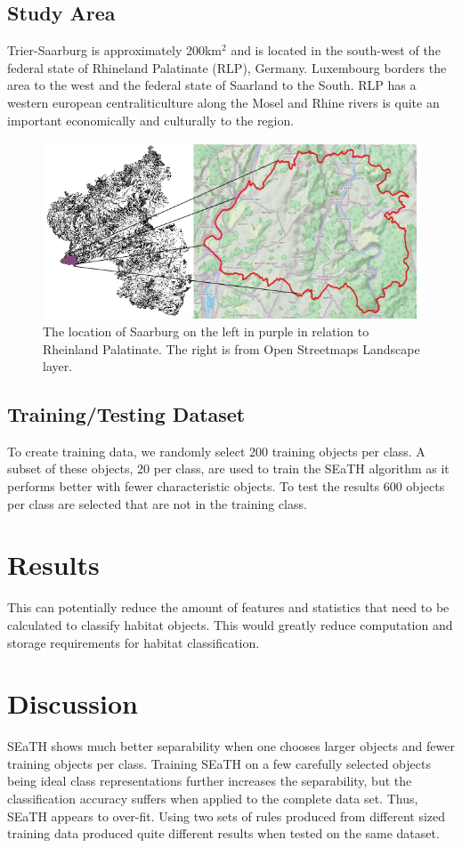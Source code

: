 \documentclass[authoryear, review,12pt,number]{elsarticle}
\begin{document}
\subsection{Study Area}
Trier-Saarburg is approximately 200km$^{2}$ and is located in the south-west of 
the federal state of Rhineland Palatinate (RLP), Germany. Luxembourg borders 
the area to the west and the federal state of Saarland to the South. 
RLP has a western european centraliticulture along the Mosel and Rhine rivers 
is quite an important economically and culturally to the region. 
\begin{figure}
	\includegraphics[width=\textwidth]{diagrams/study_area_closeup.png}
	\caption{The location of Saarburg on the left in purple in relation to 
Rheinland Palatinate. The right is from Open Streetmaps Landscape layer. }
\end{figure}

\subsection{Training/Testing Dataset}
To create training data, we randomly select 200 training objects per class. A
subset of these objects, 20 per class, are used to train the SEaTH
algorithm as it performs better with fewer characteristic objects. To test the 
results 600 objects per class are selected that are not in the training class.

\section{Results}
This can potentially reduce the amount of features
and statistics that need to be calculated to classify habitat objects. This
would greatly reduce computation and storage requirements for habitat
classification.
\section{Discussion}
SEaTH shows much better separability when one chooses larger objects and fewer
training objects per class. Training SEaTH on a few carefully selected objects
being ideal class representations further increases the separability, but the classification
accuracy suffers when applied to the complete data set. Thus, SEaTH appears to
over-fit. Using two sets of rules produced from different sized training data
produced quite different results when tested on the same dataset.
\end{document}
